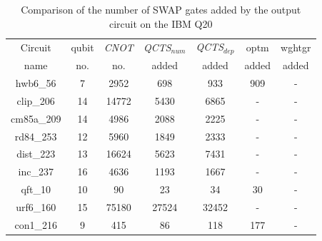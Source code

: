 \documentclass[runningheads]{llncs}
\begin{document}
				\begin{table}[H]
					\label{tab5}
					\begin{center}  
					\begin{tabular}{|c|c|c|c|c|c|c|}
					\hline
					Circuit &  qubit  & \textit{CNOT} &\textit{QCTS$_{num}$}& \textit{QCTS$_{dep}$}  & optm 	 & wghtgr 	\\
					 name	&   no. 	&	no. & added&  added &  added 	&  added\\
					\hline
					hwb6\_56 & 7 & 2952 & 698 & 933 & 909 & - \\ 
clip\_206 & 14 & 14772 & 5430 & 6865 & - & - \\ 
cm85a\_209 & 14 & 4986 & 2088 & 2225 & - & - \\ 
rd84\_253 & 12 & 5960 & 1849 & 2333 & - & - \\ 
dist\_223 & 13 & 16624 & 5623 & 7431 & - & - \\ 
inc\_237 & 16 & 4636 & 1193 & 1667 & - & - \\ 
qft\_10 & 10 & 90 & 23 & 34 & 30 & - \\ 
urf6\_160 & 15 & 75180 & 27524 & 32452 & - & - \\ 
con1\_216 & 9 & 415 & 86 & 118 & 177 & - \\ 
					\hline
					\end{tabular} 
					\end{center}	
					\caption{Comparison of  the number of  SWAP gates added by the 
					output circuit on the IBM Q20 }  
					\label{tab5}
					\end{table}
\end{document}
